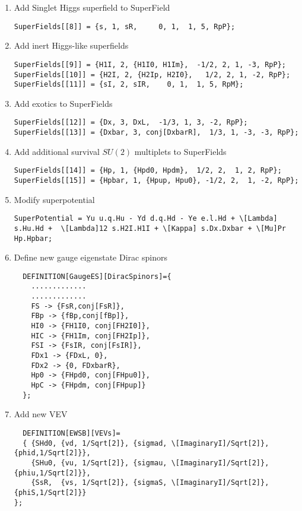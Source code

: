 \documentclass[final,3p,11pt,pdflatex]{elsarticle}
\begin{document}
\begin{enumerate}
\begin{enumerate}
\item Add Singlet Higgs superfield to SuperField
\begin{lstlisting}
SuperFields[[8]] = {s, 1, sR,     0, 1,  1, 5, RpP};
\end{lstlisting}
\item Add inert Higgs-like superfields 
\begin{lstlisting}
SuperFields[[9]] = {H1I, 2, {H1I0, H1Im},  -1/2, 2, 1, -3, RpP};
SuperFields[[10]] = {H2I, 2, {H2Ip, H2I0},   1/2, 2, 1, -2, RpP};
SuperFields[[11]] = {sI, 2, sIR,    0, 1,  1, 5, RpM};
\end{lstlisting}
\item Add exotics to SuperFields
\begin{lstlisting}
SuperFields[[12]] = {Dx, 3, DxL,  -1/3, 1, 3, -2, RpP};
SuperFields[[13]] = {Dxbar, 3, conj[DxbarR],  1/3, 1, -3, -3, RpP};
\end{lstlisting}
\item Add additional survival $SU(2)$ multiplets to SuperFields
\begin{lstlisting}
SuperFields[[14]] = {Hp, 1, {Hpd0, Hpdm},  1/2, 2,  1, 2, RpP};
SuperFields[[15]] = {Hpbar, 1, {Hpup, Hpu0}, -1/2, 2,  1, -2, RpP};
\end{lstlisting}
\item Modify superpotential
\begin{lstlisting}
SuperPotential = Yu u.q.Hu - Yd d.q.Hd - Ye e.l.Hd + \[Lambda] s.Hu.Hd +  \[Lambda]12 s.H2I.H1I + \[Kappa] s.Dx.Dxbar + \[Mu]Pr Hp.Hpbar;
\end{lstlisting}
\item Define new gauge eigenstate Dirac spinors
\begin{lstlisting}
  DEFINITION[GaugeES][DiracSpinors]={
    .............
    .............
    FS -> {FsR,conj[FsR]},
    FBp -> {fBp,conj[fBp]},
    HI0 -> {FH1I0, conj[FH2I0]},
    HIC -> {FH1Im, conj[FH2Ip]},
    FSI -> {FsIR, conj[FsIR]},
    FDx1 -> {FDxL, 0},
    FDx2 -> {0, FDxbarR}, 
    Hp0 -> {FHpd0, conj[FHpu0]},
    HpC -> {FHpdm, conj[FHpup]}
  };
\end{lstlisting}
\item Add new VEV
\begin{lstlisting} 
  DEFINITION[EWSB][VEVs]= 
  { {SHd0, {vd, 1/Sqrt[2]}, {sigmad, \[ImaginaryI]/Sqrt[2]},{phid,1/Sqrt[2]}},
    {SHu0, {vu, 1/Sqrt[2]}, {sigmau, \[ImaginaryI]/Sqrt[2]},{phiu,1/Sqrt[2]}},
    {SsR,  {vs, 1/Sqrt[2]}, {sigmaS, \[ImaginaryI]/Sqrt[2]},{phiS,1/Sqrt[2]}}
};
\end{lstlisting}

\end{enumerate}
\end{enumerate}
\end{document}
